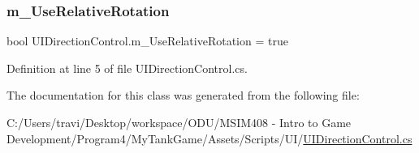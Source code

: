 \subsubsection{\texorpdfstring{m\+\_\+\+Use\+Relative\+Rotation}{m\_UseRelativeRotation}}
{\footnotesize\ttfamily bool U\+I\+Direction\+Control.\+m\+\_\+\+Use\+Relative\+Rotation = true}



Definition at line 5 of file U\+I\+Direction\+Control.\+cs.



The documentation for this class was generated from the following file\+:\begin{DoxyCompactItemize}
\item 
C\+:/\+Users/travi/\+Desktop/workspace/\+O\+D\+U/\+M\+S\+I\+M408 -\/ Intro to Game Development/\+Program4/\+My\+Tank\+Game/\+Assets/\+Scripts/\+U\+I/\hyperlink{_u_i_direction_control_8cs}{U\+I\+Direction\+Control.\+cs}\end{DoxyCompactItemize}
